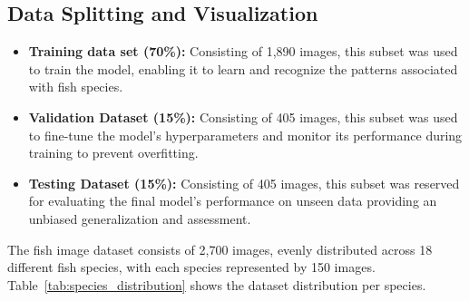 \subsection{Data Splitting and Visualization}
\begin{itemize}
  \item \textbf{Training data set (70\%):} Consisting of 1,890 images, this subset was used to train the model, enabling it to learn and recognize the patterns associated with fish species.

\item \textbf{Validation Dataset (15\%):} Consisting of 405 images, this subset was used to fine-tune the model's hyperparameters and monitor its performance during training to prevent overfitting.

\item \textbf{Testing Dataset (15\%):} Consisting of 405 images, this subset was reserved for evaluating the final model's performance on unseen data providing an unbiased generalization and assessment. 
\end{itemize}


The fish image dataset consists of 2,700 images, evenly distributed across 18 different fish species, with each species represented by 150 images.  Table~\ref{tab:species_distribution} shows the dataset distribution per species.


\vspace{0.5cm} %

